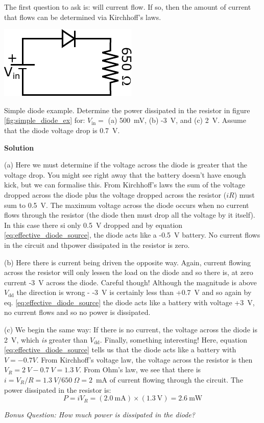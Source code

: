 \documentclass{tufte-book}
\newcommand\Solution{\par\textbf{\textsf{Solution}}\par\medskip}
\begin{document}
The first question to ask is: will current flow. If so, then the amount of current that flows can be determined via Kirchhoff's laws.

\begin{marginfigure}
  \includegraphics[]{simple_diode_ex}
  \caption{Simple diode example.}
  \label{fig:simple_diode_ex}
\end{marginfigure}


\begin{myexample}[label = ex:simple_diode]{Simple diode example.}
Determine the power dissipated in the resistor in figure \ref{fig:simple_diode_ex} for: $V_\text{in} = $ (a) 500~mV, (b) -3~V, and (c) 2~V. Assume that the diode voltage drop is 0.7~V.
\Solution
(a) Here we must determine if the voltage across the diode is greater that the voltage drop. You might see right away that the battery doesn't have enough kick, but we can formalise this. From Kirchhoff's laws the sum of the voltage dropped across the diode plus the voltage dropped across the resistor ($iR$) must sum to 0.5~V. The maximum voltage across the diode occurs when no current flows through the resistor (the diode then must drop all the voltage by it itself). In this case there si only 0.5~V dropped and by equation \ref{eq:effective_diode_source}, the diode acts like a -0.5~V battery. No current flows in the circuit and thpower dissipated in the resistor is zero.

(b) Here there is current being driven the opposite way. Again, current flowing across the resistor will only lessen the load on the diode and so there is, at zero current -3~V across the diode. Careful though! Although the magnitude is above $V_\text{dd}$ the direction is wrong - -3~V is certainly less than +0.7~V and so again by eq. \ref{eq:effective_diode_source} the diode acts like a battery with voltage +3~V, no current flows and so no power is dissipated.

(c) We begin the same way: If there is no current, the voltage across the diode is 2~V, which \textit{is} greater than $V_\text{dd}$. Finally, something interesting! Here, equation \ref{eq:effective_diode_source} tells us that the diode acts like a battery with $V=-0.7V$. From Kirchhoff's voltage law, the voltage across the resistor is then $V_R = 2~V-0.7~V = 1.3~V$. From Ohm's law, we see that there is $i = V_R/R = 1.3~V/650~\Omega = 2$~mA of current flowing through the circuit. The power dissipated in the resistor is:
$$
P = iV_R = \left(2.0~\text{mA}\right)\times\left(1.3~\text{V}\right) = 2.6~\text{mW}
$$

\textit{Bonus Question: How much power is dissipated in the diode?}
\end{myexample}
\end{document}

